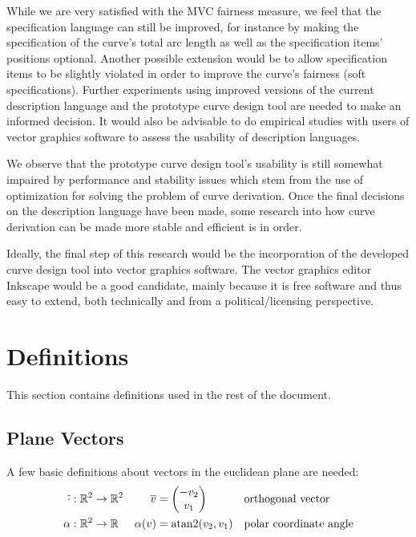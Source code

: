 \documentclass[a4paper]{article}
\begin{document}
		While we are very satisfied with the MVC fairness measure, we feel that the specification language can still be improved, for instance by making the specification of the curve's total arc length as well as the specification items' positions optional. Another possible extension would be to allow specification items to be slightly violated in order to improve the curve's fairness (soft specifications). Further experiments using improved versions of the current description language and the prototype curve design tool are needed to make an informed decision. It would also be advisable to do empirical studies with users of vector graphics software to assess the usability of description languages.

		We observe that the prototype curve design tool's usability is still somewhat impaired by performance and stability issues which stem from the use of optimization for solving the problem of curve derivation. Once the final decisions on the description language have been made, some research into how curve derivation can be made more stable and efficient is in order.

		Ideally, the final step of this research would be the incorporation of the developed curve design tool into vector graphics software. The vector graphics editor Inkscape would be a good candidate, mainly because it is free software and thus easy to extend, both technically and from a political/licensing perspective.

	\clearpage

	\appendix

	\section{Definitions}
	\label{section:definitions}

		This section contains definitions used in the rest of the document.

		\subsection{Plane Vectors}
		\label{section:plane_vectors}

			A few basic definitions about vectors in the euclidean plane are needed:
			\begin{align*}
				\overline{\cdot} & : \function{\R{2}}{\R{2}} & \overline{v}      & = \vectorB{-v_2}{v_1}      && \text{orthogonal vector}\\
				\alpha           & : \function{\R{2}}{\RR}   & \apply{\alpha}{v} & = \apply{\atan2}{v_2, v_1} && \text{polar coordinate angle}
			\end{align*}
\end{document}
